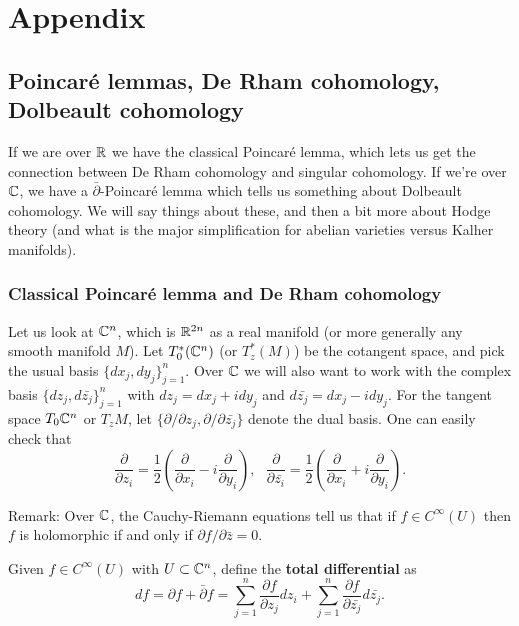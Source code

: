 



\section{Appendix}\label{Chapters/appendix}

\subsection{Poincar\'{e} lemmas, De Rham cohomology, Dolbeault cohomology}

If we are over ${\mathbb R}$ we have the classical Poincar\'{e} lemma, which lets us get the connection between De Rham cohomology and singular cohomology. If we're over ${\mathbb C}$, we have a $\bar{\partial}$-Poincar\'{e} lemma which tells us something about Dolbeault cohomology. We will say things about these, and then a bit more about Hodge theory (and what is the major simplification for abelian varieties versus Kalher manifolds).

\subsubsection{Classical Poincar\'{e} lemma and De Rham cohomology} 
Let us look at ${\mathbb C}^n$, which is ${\mathbb R}^{2n}$ as a real manifold (or more generally any smooth manifold $M$). Let $T_0^*({\mathbb C}^n)$ (or $T_z^*(M)$) be the cotangent space, and pick the usual basis $\{dx_j,dy_j\}_{j=1}^n$. Over ${\mathbb C}$ we will also want to work with the complex basis $\{dz_j,d\bar{z_j}\}_{j=1}^n$ with $dz_j=dx_j+idy_j$ and $d\bar{z_j}=dx_j-idy_j$. For the tangent space $T_0 {\mathbb C}^n$ or $T_z M$, let $\{\partial/\partial z_j,\partial/\partial \bar{z_j}\}$ denote the dual basis. One can easily check that 
$$\frac{\partial}{\partial z_i}=\frac{1}{2}\left(\frac{\partial}{\partial x_i}-i\frac{\partial}{\partial y_i}\right),\ \ \ \frac{\partial}{\partial \bar{z_i}}=\frac{1}{2}\left(\frac{\partial}{\partial x_i}+i\frac{\partial}{\partial y_i}\right).$$

Remark: Over ${\mathbb C}$, the Cauchy-Riemann equations tell us that if $f\in C^\infty(U)$ then $f$ is holomorphic if and only if $\partial f/\partial \bar{z}=0$. 

Given $f\in C^\infty(U)$ with $U\subset {\mathbb C}^n$, define the \textbf{total differential} as 
$$df=\partial f+\bar{\partial}f=\sum_{j=1}^n \frac{\partial f}{\partial z_j}dz_i+\sum_{j=1}^n \frac{\partial f}{\partial \bar{z_j}}d\bar{z_j}.$$

